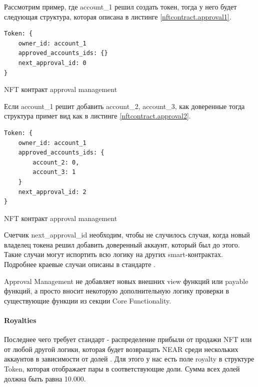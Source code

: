 Рассмотрим пример, где account\_1 решил создать токен, тогда у него будет следующая структура, которая описана в листинге {\color{blue}\ref{nftcontract.approval1}}.
\begin{listing}
\begin{verbatim}
Token: {
    owner_id: account_1
    approved_accounts_ids: {}
    next_approval_id: 0
}
\end{verbatim}
\caption{NFT контракт approval management}
\label{nftcontract.approval1}
\end{listing}

Если account\_1 решит добавить account\_2, account\_3, как доверенные тогда структура примет вид как в листинге {\color{blue}\ref{nftcontract.approval2}}.
\begin{listing}
\begin{verbatim}
Token: {
    owner_id: account_1
    approved_accounts_ids: {
        account_2: 0,
        account_3: 1
    }
    next_approval_id: 2
}
\end{verbatim}
\caption{NFT контракт approval management}
\label{nftcontract.approval2}
\end{listing}

Счетчик next\_approval\_id  необходим, чтобы не случилось случая, когда новый владелец токена решил добавить доверенный аккаунт, который был до этого. Такие случаи могут испортить всю логику на других smart-контрактах.
Подробнее краевые случаи описаны в стандарте \cite{approvalstandard}.

Approval Management не добавляет новых внешних view функций или payable функций, а просто вносит некоторую дополнительную логику проверки в существующие функции из секции Core Functionality.

\paragraph{Royalties}
\label{section.main.smart.struct.royalties}

Последнее чего требует стандарт - распределение прибыли от продажи NFT или от любой другой логики, которая будет возвращать NEAR среди нескольких аккаунтов в зависимости от долей \cite{royaltystandard}.
Для этого у нас есть поле royalty в структуре Token, которая отображает пары в соответствующие доли. Сумма всех долей должна быть равна 10.000.


